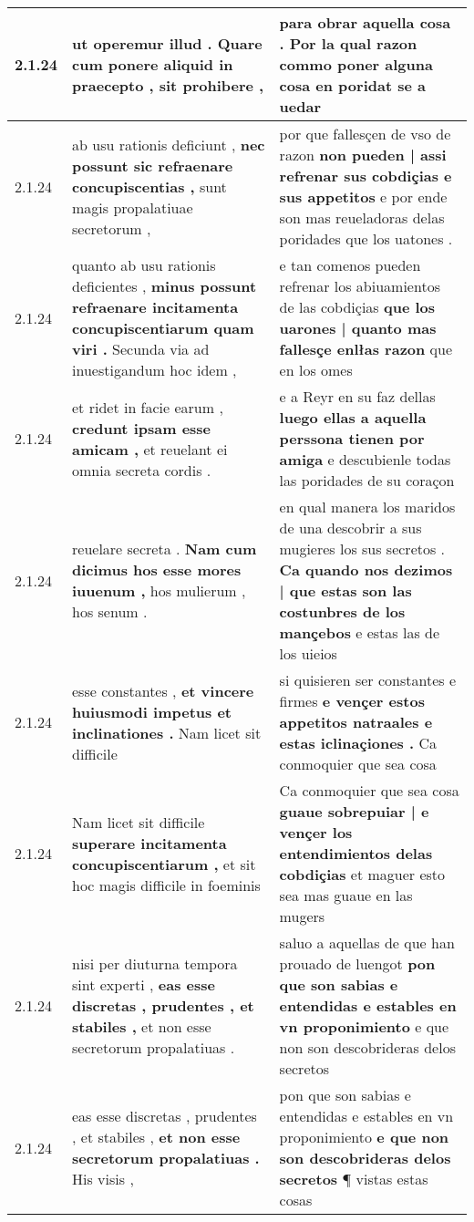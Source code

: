 \begin{tabular}{|p{1cm}|p{6.5cm}|p{6.5cm}|}
2.1.24 & ut operemur illud . \textbf{ Quare cum ponere aliquid in praecepto , } sit prohibere , & para obrar aquella cosa . \textbf{ Por la qual razon commo poner alguna cosa } en poridat se a uedar \\\hline
2.1.24 & ab usu rationis deficiunt , \textbf{ nec possunt sic refraenare concupiscentias , } sunt magis propalatiuae secretorum , & por que fallesçen de vso de razon \textbf{ non pueden | assi refrenar sus cobdiçias e sus appetitos } e por ende son mas reueladoras delas poridades que los uatones . \\\hline
2.1.24 & quanto ab usu rationis deficientes , \textbf{ minus possunt refraenare incitamenta concupiscentiarum quam viri . } Secunda via ad inuestigandum hoc idem , & e tan comenos pueden refrenar los abiuamientos de las cobdiçias \textbf{ que los uarones | quanto mas fallesçe enlłas razon } que en los omes \\\hline
2.1.24 & et ridet in facie earum , \textbf{ credunt ipsam esse amicam , } et reuelant ei omnia secreta cordis . & e a Reyr en su faz dellas \textbf{ luego ellas a aquella perssona tienen por amiga } e descubienle todas las poridades de su coraçon \\\hline
2.1.24 & reuelare secreta . \textbf{ Nam cum dicimus hos esse mores iuuenum , } hos mulierum , hos senum . & en qual manera los maridos de una descobrir a sus mugieres los sus secretos . \textbf{ Ca quando nos dezimos | que estas son las costunbres de los mançebos } e estas las de los uieios \\\hline
2.1.24 & esse constantes , \textbf{ et vincere huiusmodi impetus et inclinationes . } Nam licet sit difficile & si quisieren ser constantes e firmes \textbf{ e vençer estos appetitos natraales e estas iclinaçiones . } Ca conmoquier que sea cosa \\\hline
2.1.24 & Nam licet sit difficile \textbf{ superare incitamenta concupiscentiarum , } et sit hoc magis difficile in foeminis & Ca conmoquier que sea cosa \textbf{ guaue sobrepuiar | e vençer los entendimientos delas cobdiçias } et maguer esto sea mas guaue en las mugers \\\hline
2.1.24 & nisi per diuturna tempora sint experti , \textbf{ eas esse discretas , prudentes , et stabiles , } et non esse secretorum propalatiuas . & saluo a aquellas de que han prouado de luengot \textbf{ pon que son sabias e entendidas e estables en vn proponimiento } e que non son descobrideras delos secretos \\\hline
2.1.24 & eas esse discretas , prudentes , et stabiles , \textbf{ et non esse secretorum propalatiuas . } His visis , & pon que son sabias e entendidas e estables en vn proponimiento \textbf{ e que non son descobrideras delos secretos } ¶ vistas estas cosas \\\hline

\end{tabular}
